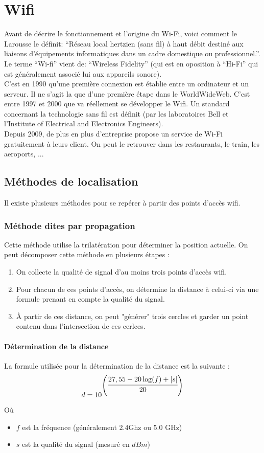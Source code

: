 \documentclass[11pt,a4paper]{article}
\begin{document}
\section{Wifi}
  Avant de décrire le fonctionnement et l'origine du Wi-Fi, voici comment le Larousse le définit: ``Réseau local hertzien (sans fil) à haut débit destiné aux liaisons d'équipements informatiques dans un cadre domestique ou professionnel.''.
  Le terme ``Wi-fi'' vient de: ``Wireless Fidelity'' (qui est en oposition à ``Hi-Fi'' qui est généralement associé lui aux appareils sonore).\\
  C'est en 1990 qu'une première connexion est établie entre un ordinateur et un serveur.  Il ne s'agit la que d'une première étape dans le WorldWideWeb.  C'est entre 1997 et 2000 que va réellement se développer le Wifi.  Un standard concernant la technologie sans fil est définit (par les laboratoires Bell et l'Institute of Electrical and Electronics Engineers).\\
  Depuis 2009, de plus en plus d'entreprise propose un service de Wi-Fi gratuitement à leurs client.  On peut le retrouver dans les restaurants, le train, les aeroports, ...
  \subsection{Méthodes de localisation}
  Il existe plusieurs méthodes pour se repérer à partir des points d'accès wifi.
  
  \subsubsection{Méthode dites par propagation}
    Cette méthode utilise la trilatération pour déterminer la position actuelle. On peut décomposer cette méthode en plusieurs étapes :
    \begin{enumerate}
      \item On collecte la qualité de signal d'au moins trois points d'accès wifi.
      \item Pour chacun de ces points d'accès, on détermine la distance à celui-ci via une formule prenant en compte la qualité du signal.
      \item À partir de ces distance, on peut "générer" trois cercles et garder un point contenu dans l'intersection de ces cerlces.
    \end{enumerate}
    
    \paragraph{Détermination de la distance}
      La formule utilisée pour la détermination de la distance est la suivante :
      \[d = 10^{\left(\cfrac{27,55-20\log(f)+\left|s\right|}{20}\right)}\]
      Où \begin{itemize}
        \item[] $f$ est la fréquence (généralement 2.4Ghz ou 5.0 GHz)
        \item[] $s$ est la qualité du signal (mesuré en $dBm$)
      \end{itemize}     
    
\end{document}

